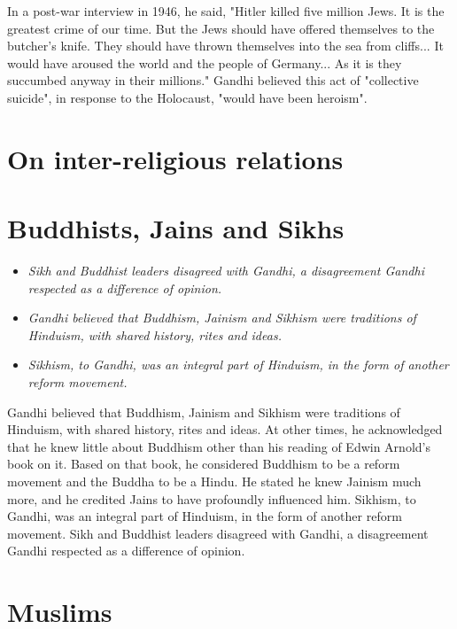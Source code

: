 In a post-war interview in 1946, he said, "Hitler killed five million
Jews. It is the greatest crime of our time. But the Jews should have
offered themselves to the butcher's knife. They should have thrown
themselves into the sea from cliffs... It would have aroused the world
and the people of Germany... As it is they succumbed anyway in their
millions." Gandhi believed this act of "collective suicide", in response
to the Holocaust, "would have been heroism".

\section{On inter-religious
relations}\label{on-inter-religious-relations}

\section{Buddhists, Jains and Sikhs}\label{buddhists-jains-and-sikhs}

\begin{itemize}
\item
  \emph{Sikh and Buddhist leaders disagreed with Gandhi, a disagreement
  Gandhi respected as a difference of opinion.}
\item
  \emph{Gandhi believed that Buddhism, Jainism and Sikhism were
  traditions of Hinduism, with shared history, rites and ideas.}
\item
  \emph{Sikhism, to Gandhi, was an integral part of Hinduism, in the
  form of another reform movement.}
\end{itemize}

Gandhi believed that Buddhism, Jainism and Sikhism were traditions of
Hinduism, with shared history, rites and ideas. At other times, he
acknowledged that he knew little about Buddhism other than his reading
of Edwin Arnold's book on it. Based on that book, he considered Buddhism
to be a reform movement and the Buddha to be a Hindu. He stated he knew
Jainism much more, and he credited Jains to have profoundly influenced
him. Sikhism, to Gandhi, was an integral part of Hinduism, in the form
of another reform movement. Sikh and Buddhist leaders disagreed with
Gandhi, a disagreement Gandhi respected as a difference of opinion.

\section{Muslims}\label{muslims}

